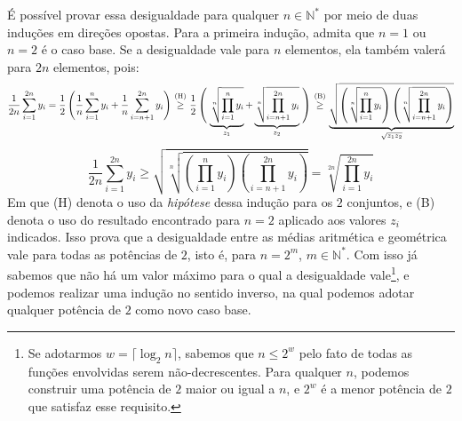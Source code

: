 É possível provar essa desigualdade para qualquer $n \in \mathds{N}^*$
por meio de duas induções em direções opostas.
Para a primeira indução, admita que $n = 1$ ou $n = 2$ é o caso base.
Se a desigualdade vale para $n$ elementos,
ela também valerá para $2n$ elementos, pois:
\[
    \dfrac{1}{2n} \sum_{i=1}^{2n} y_i
  =
    \dfrac{1}{2}
    \left(
      \dfrac{1}{n} \sum_{i=1}^{n} y_i +
      \dfrac{1}{n} \sum_{i=n+1}^{2n} y_i
    \right)
  \stackfirst{\text{(H)}}{\ge}
    \dfrac{1}{2}
    \left(\vphantom{\sqrt{\prod_{i=1}^n}}\right.
      \underbrace{\sqrt[n]{\prod_{i=1}^n y_i}}_{z_1} +
      \underbrace{\sqrt[n]{\prod_{i=n+1}^{2n} y_i}}_{z_2}
    \left.\vphantom{\sqrt{\prod_{i=1}^n}}\right)
  \stackfirst{\text{(B)}}{\ge}
    \underbrace{
      \sqrt{ \left( \sqrt[n]{\prod_{i=1}^n y_i} \right)
             \left( \sqrt[n]{\prod_{i=n+1}^{2n} y_i} \right) }
    }_{\sqrt{z_1 z_2}}
\]\[
    \dfrac{1}{2n} \sum_{i=1}^{2n} y_i
  \ge
    \sqrt{ \sqrt[n]{ \left( \prod_{i=1}^n y_i \right)
                     \left( \prod_{i=n+1}^{2n} y_i \right) } }
  =
    \sqrt[2n]{\prod_{i=1}^{2n} y_i}
\]
Em que (H) denota o uso da \emph{hipótese} dessa indução
para os $2$ conjuntos,
e (B) denota o uso do resultado encontrado para $n = 2$
aplicado aos valores $z_i$ indicados.
Isso prova que a desigualdade entre as médias aritmética e geométrica
vale para todas as potências de $2$, isto é,
para $n = 2^m$, $m \in \mathds{N}^*$.
Com isso já sabemos que não há um valor máximo
para o qual a desigualdade vale\footnote{
  Se adotarmos $w = \lceil\log_2 n\rceil$, sabemos que $n \le 2^w$
  pelo fato de todas as funções envolvidas serem não-decrescentes.
  Para qualquer $n$,
  podemos construir uma potência de $2$ maior ou igual a $n$,
  e $2^w$ é a menor potência de $2$ que satisfaz esse requisito.
},
e podemos realizar uma indução no sentido inverso,
na qual podemos adotar qualquer potência de $2$ como novo caso base.

